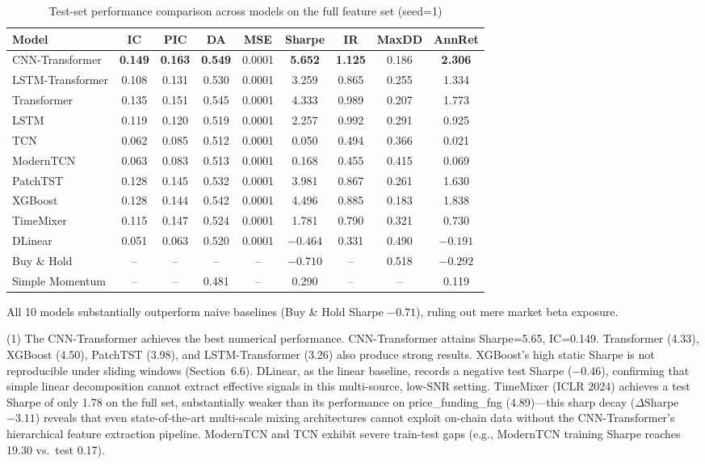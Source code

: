 \documentclass[a4paper]{cas-dc}
\begin{document}
\begin{table}[t]
\centering
\footnotesize
\caption{Test-set performance comparison across models on the full feature set (seed=1)}
\label{tab:full_results}
\begin{tabular}{lcccccccc}
\toprule
Model & IC & PIC & DA & MSE & Sharpe & IR & MaxDD & AnnRet \\
\midrule
CNN-Transformer & \textbf{0.149} & \textbf{0.163} & \textbf{0.549} & 0.0001 & \textbf{5.652} & \textbf{1.125} & 0.186 & \textbf{2.306} \\
LSTM-Transformer & 0.108 & 0.131 & 0.530 & 0.0001 & 3.259 & 0.865 & 0.255 & 1.334 \\
Transformer & 0.135 & 0.151 & 0.545 & 0.0001 & 4.333 & 0.989 & 0.207 & 1.773 \\
LSTM & 0.119 & 0.120 & 0.519 & 0.0001 & 2.257 & 0.992 & 0.291 & 0.925 \\
TCN & 0.062 & 0.085 & 0.512 & 0.0001 & 0.050 & 0.494 & 0.366 & 0.021 \\
ModernTCN & 0.063 & 0.083 & 0.513 & 0.0001 & 0.168 & 0.455 & 0.415 & 0.069 \\
PatchTST & 0.128 & 0.145 & 0.532 & 0.0001 & 3.981 & 0.867 & 0.261 & 1.630 \\
XGBoost & 0.128 & 0.144 & 0.542 & 0.0001 & 4.496 & 0.885 & 0.183 & 1.838 \\
TimeMixer & 0.115 & 0.147 & 0.524 & 0.0001 & 1.781 & 0.790 & 0.321 & 0.730 \\
DLinear & 0.051 & 0.063 & 0.520 & 0.0001 & $-0.464$ & 0.331 & 0.490 & $-0.191$ \\
\midrule
Buy \& Hold & -- & -- & -- & -- & $-0.710$ & -- & 0.518 & $-0.292$ \\
Simple Momentum & -- & -- & 0.481 & -- & 0.290 & -- & -- & 0.119 \\
\bottomrule
\end{tabular}
\end{table}

All 10 models substantially outperform naive baselines (Buy \& Hold Sharpe $-0.71$), ruling out mere market beta exposure.

(1) The CNN-Transformer achieves the best numerical performance. CNN-Transformer attains Sharpe=5.65, IC=0.149. Transformer (4.33), XGBoost (4.50), PatchTST (3.98), and LSTM-Transformer (3.26) also produce strong results. XGBoost's high static Sharpe is not reproducible under sliding windows (Section~6.6). DLinear, as the linear baseline, records a negative test Sharpe ($-0.46$), confirming that simple linear decomposition cannot extract effective signals in this multi-source, low-SNR setting. TimeMixer (ICLR 2024) achieves a test Sharpe of only 1.78 on the full set, substantially weaker than its performance on price\_funding\_fng (4.89)---this sharp decay ($\Delta$Sharpe $-3.11$) reveals that even state-of-the-art multi-scale mixing architectures cannot exploit on-chain data without the CNN-Transformer's hierarchical feature extraction pipeline. ModernTCN and TCN exhibit severe train-test gaps (e.g., ModernTCN training Sharpe reaches 19.30 vs.\ test 0.17).
\end{document}
